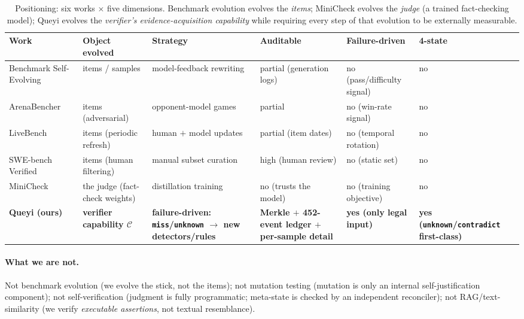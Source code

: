 \documentclass{article}
\begin{document}
\begin{table}[t]
\caption{Positioning: six works $\times$ five dimensions. Benchmark evolution evolves the
\emph{items}; MiniCheck evolves the \emph{judge} (a trained fact-checking model); Queyi evolves
the \emph{verifier's evidence-acquisition capability} while requiring every step of that
evolution to be externally measurable.}
\label{tab:positioning}
\centering
\footnotesize
\begin{tabular}{@{}p{2.5cm}p{2.2cm}p{2.6cm}p{2.2cm}p{2.1cm}p{2.0cm}@{}}
\toprule
Work & Object evolved & Strategy & Auditable & Failure-driven & 4-state \\
\midrule
Benchmark Self-Evolving~\cite{wang2024benchmarkevolving} & items / samples & model-feedback rewriting & partial (generation logs) & no (pass/difficulty signal) & no \\
ArenaBencher~\cite{liu2025arenabencher} & items (adversarial) & opponent-model games & partial & no (win-rate signal) & no \\
LiveBench~\cite{white2024livebench} & items (periodic refresh) & human $+$ model updates & partial (item dates) & no (temporal rotation) & no \\
SWE-bench Verified~\cite{jimenez2024swebench,liang2025illusion} & items (human filtering) & manual subset curation & high (human review) & no (static set) & no \\
MiniCheck~\cite{tang2024minicheck} & the judge (fact-check weights) & distillation training & no (trusts the model) & no (training objective) & no \\
\textbf{Queyi (ours)} & \textbf{verifier capability $\mathcal{C}$} & \textbf{failure-driven: \texttt{miss}/\texttt{unknown} $\to$ new detectors/rules} & \textbf{Merkle $+$ 452-event ledger $+$ per-sample detail} & \textbf{yes (only legal input)} & \textbf{yes (\texttt{unknown}/\texttt{contradict} first-class)} \\
\bottomrule
\end{tabular}
\end{table}

\paragraph{What we are not.} Not benchmark evolution (we evolve the stick, not the items); not
mutation testing (mutation is only an internal self-justification component); not
self-verification (judgment is fully programmatic; meta-state is checked by an independent
reconciler); not RAG/text-similarity (we verify \emph{executable assertions}, not textual
resemblance).
\end{document}
